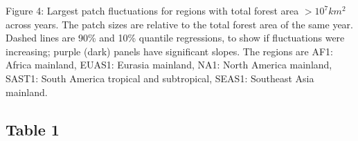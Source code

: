\documentclass[]{article}
\begin{document}
Figure 4: Largest patch fluctuations for regions with total forest area
\(>10^{7} \si{km^2}\) across years. The patch sizes are relative to the
total forest area of the same year. Dashed lines are 90\% and 10\%
quantile regressions, to show if fluctuations were increasing; purple
(dark) panels have significant slopes. The regions are AF1: Africa
mainland, EUAS1: Eurasia mainland, NA1: North America mainland, SAST1:
South America tropical and subtropical, SEAS1: Southeast Asia mainland.

\newpage

\subsection{Table 1}\label{table-1}

\scriptsize
\end{document}
